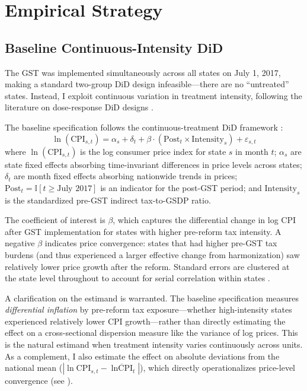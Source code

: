 \documentclass[12pt]{article}
\newcommand{\ind}{\mathbb{I}}
\begin{document}



\section{Empirical Strategy}\label{sec:strategy}

\subsection{Baseline Continuous-Intensity DiD}

The GST was implemented simultaneously across all states on July 1, 2017, making a standard two-group DiD design infeasible---there are no ``untreated'' states. Instead, I exploit continuous variation in treatment intensity, following the literature on dose-response DiD designs \citep{callaway2021difference, goodman2021difference}.

The baseline specification follows the continuous-treatment DiD framework \citep{callaway2021difference, dechaisemartin2020two}:
\begin{equation}\label{eq:baseline}
\ln(\text{CPI}_{s,t}) = \alpha_s + \delta_t + \beta \cdot (\text{Post}_t \times \text{Intensity}_s) + \varepsilon_{s,t}
\end{equation}
where $\ln(\text{CPI}_{s,t})$ is the log consumer price index for state $s$ in month $t$; $\alpha_s$ are state fixed effects absorbing time-invariant differences in price levels across states; $\delta_t$ are month fixed effects absorbing nationwide trends in prices; $\text{Post}_t = \ind[t \geq \text{July 2017}]$ is an indicator for the post-GST period; and $\text{Intensity}_s$ is the standardized pre-GST indirect tax-to-GSDP ratio.

The coefficient of interest is $\beta$, which captures the differential change in log CPI after GST implementation for states with higher pre-reform tax intensity. A negative $\beta$ indicates price convergence: states that had higher pre-GST tax burdens (and thus experienced a larger effective change from harmonization) saw relatively lower price growth after the reform. Standard errors are clustered at the state level throughout to account for serial correlation within states \citep{bertrand2004much, cameron2015practitioners}.

A clarification on the estimand is warranted. The baseline specification measures \textit{differential inflation} by pre-reform tax exposure---whether high-intensity states experienced relatively lower CPI growth---rather than directly estimating the effect on a cross-sectional dispersion measure like the variance of log prices. This is the natural estimand when treatment intensity varies continuously across units. As a complement, I also estimate the effect on absolute deviations from the national mean ($|{\ln \text{CPI}_{s,t} - \overline{\ln \text{CPI}}_t}|$), which directly operationalizes price-level convergence (see ).
\end{document}
